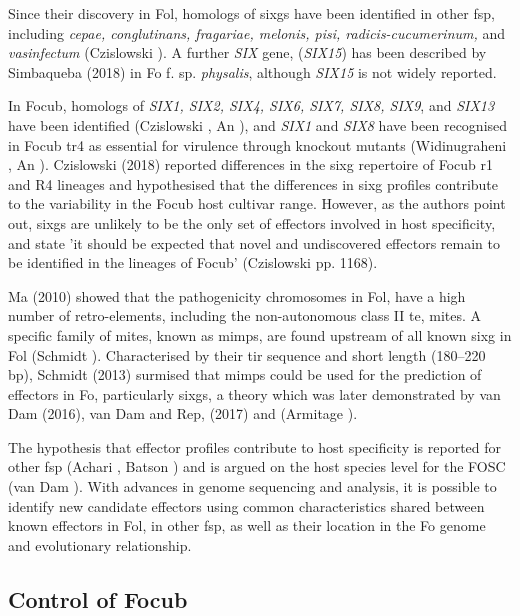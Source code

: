 Since their discovery in \ac{Fol}, homologs of \acp{sixg} have been identified in other \ac{fsp}, including \textit{cepae, conglutinans, fragariae, melonis, pisi, radicis-cucumerinum,} and \textit{vasinfectum} (Czislowski ). A further \textit{SIX} gene, (\textit{SIX15}) has been described by Simbaqueba \et (2018) in \acl{Fo} f. sp. \textit{physalis}, although \textit{SIX15} is not widely reported. 

In \ac{Focub}, homologs of \textit{SIX1, SIX2, SIX4, SIX6, SIX7, SIX8, SIX9}, and \textit{SIX13} have been identified (Czislowski , An ), and \textit{SIX1} and \textit{SIX8} have been recognised in \ac{Focub} \ac{tr4} as essential for virulence through knockout mutants (Widinugraheni , An ). Czislowski \et (2018) reported differences in the \ac{sixg} repertoire of \ac{Focub} \ac{r1} and R4 lineages and hypothesised that the differences in \ac{sixg} profiles contribute to the variability in the \ac{Focub} host cultivar range.  However, as the authors point out, \acp{sixg} are unlikely to be the only set of effectors involved in host specificity, and state 'it should be expected that novel and undiscovered effectors remain to be identified in the lineages of \ac{Focub}' (Czislowski  pp. 1168).  

Ma \et (2010) showed that the pathogenicity chromosomes in \ac{Fol}, have a high number of retro-elements, including the non-autonomous class II \ac{te}, \ac{mites}. A specific family of \ac{mites}, known as \acp{mimp}, are found upstream of all known \ac{sixg} in \ac{Fol} (Schmidt ). Characterised by their \ac{tir} sequence and short length (180–220 \acs{bp}), Schmidt \et (2013) surmised that \acp{mimp} could be used for the prediction of effectors in \ac{Fo}, particularly \acp{sixg}, a theory which was later demonstrated by van Dam \et (2016), van Dam and Rep, (2017) and (Armitage ). 

The hypothesis that effector profiles contribute to host specificity is reported for other \ac{fsp} (Achari , Batson ) and is argued on the host species level for the \ac{FOSC} (van Dam ). With advances in genome sequencing and analysis, it is possible to identify new candidate effectors using common characteristics shared between known effectors in \ac{Fol}, in other \ac{fsp}, as well as their location in the \ac{Fo} genome and evolutionary relationship.

\subsection{Control of \acl{Focub}}

